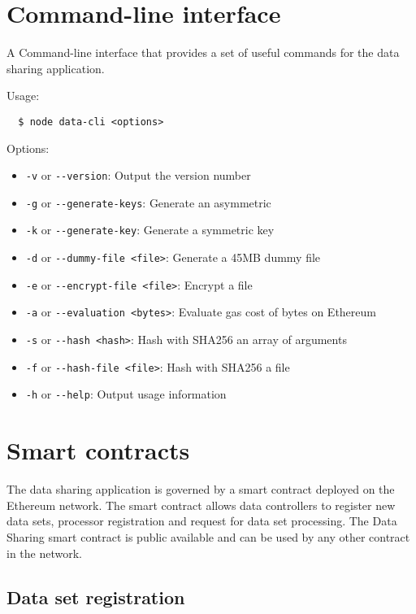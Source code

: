 \section{Command-line interface}
\label{implemenation:cli}

A Command-line interface that provides a set of useful commands for the data sharing application.

Usage:

\begin{verbatim}
  $ node data-cli <options>
\end{verbatim}

Options:

\begin{itemize}
  \item \verb|-v| or \verb|--version|: Output the version number
  \item \verb|-g| or \verb|--generate-keys|: Generate an asymmetric
  \item \verb|-k| or \verb|--generate-key|: Generate a symmetric key
  \item \verb|-d| or \verb|--dummy-file <file>|: Generate a 45MB dummy file
  \item \verb|-e| or \verb|--encrypt-file <file>|: Encrypt a file
  \item \verb|-a| or \verb|--evaluation <bytes>|: Evaluate gas cost of bytes on Ethereum
  \item \verb|-s| or \verb|--hash <hash>|: Hash with SHA256 an array of arguments
  \item \verb|-f| or \verb|--hash-file <file>|: Hash with SHA256 a file
  \item \verb|-h| or \verb|--help|: Output usage information
\end{itemize}

\section{Smart contracts}
\label{implemenation:contracts}

The data sharing application is governed by a smart contract deployed on the Ethereum network. The smart contract allows data controllers to register new data sets, processor registration and request for data set processing. The Data Sharing smart contract is public available and can be used by any other contract in the network.

\subsection{Data set registration}
\label{implemenation:contracts:data_reg}


